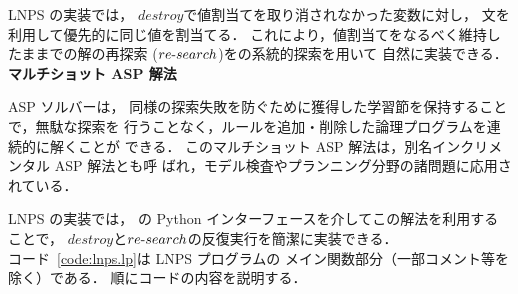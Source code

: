 LNPS の実装では，
$destroy$で値割当てを取り消されなかった変数に対し，
文を利用して優先的に同じ値を割当てる．
これにより，値割当てをなるべく維持したままでの解の再探索
($re\mathchar`-search$)を{\clingo}の系統的探索を用いて
自然に実装できる．\\

\textbf{マルチショット ASP 解法}

ASP ソルバー{\clingo}は，
同様の探索失敗を防ぐために獲得した学習節を保持することで，無駄な探索を
行うことなく，ルールを追加・削除した論理プログラムを連続的に解くことが
できる．
このマルチショット ASP 解法は，別名インクリメンタル ASP 解法とも呼
ばれ，モデル検査やプランニング分野の諸問題に応用されている．

LNPS の実装では，
{\clingo}の Python インターフェースを介してこの解法を利用することで，
$destroy$と$re\mathchar`-search$の反復実行を簡潔に実装できる．\\

コード~\ref{code:lnps.lp}は LNPS プログラムの
メイン関数部分（一部コメント等を除く）である．
順にコードの内容を説明する．\\



